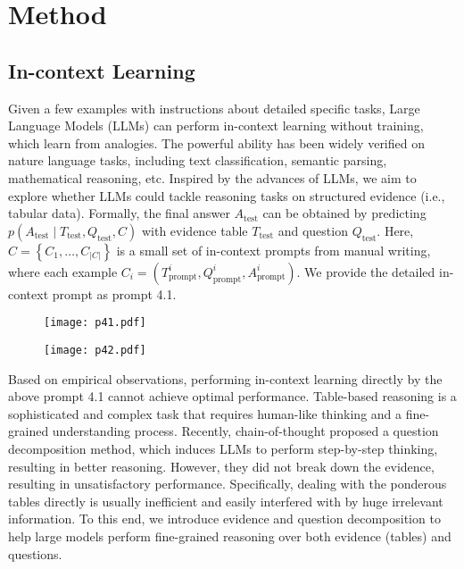 \section{Method}
\subsection{In-context Learning}
Given a few examples with instructions about detailed specific tasks, Large Language Models (LLMs) can perform in-context learning without training, which learn from analogies.
The powerful ability has been widely verified on nature language tasks, including text classification, semantic parsing, mathematical reasoning, etc.
Inspired by the advances of LLMs, we aim to explore whether LLMs could tackle reasoning tasks on structured evidence (i.e., tabular data).
Formally, the final answer $A_{\text{test}}$ can be obtained by predicting $p(A_{\text{test}} \mid T_{\text{test}}, Q_{\text{test}}, C)$ with evidence table $T_{\text{test}}$ and question $Q_{\text{test}}$. 
Here, $C=\left\{C_1, \ldots, C_{|C|}\right\}$ is a small set of in-context prompts from manual writing, where each example $C_i = (T_{\text{prompt}}^i, Q_{\text{prompt}}^i, A_{\text{prompt}}^i)$. 
We provide the detailed in-context prompt as prompt 4.1.

\begin{figure}[htbp]
\centering
\begin{minipage}[t]{0.48\textwidth}
\centering
\texttt{[image: p41.pdf]}
\end{minipage}
\begin{minipage}[t]{0.48\textwidth}
\centering
\texttt{[image: p42.pdf]}
\end{minipage}
\end{figure}

Based on empirical observations, performing in-context learning directly by the above prompt 4.1 cannot achieve optimal performance. Table-based reasoning is a sophisticated and complex task that requires human-like thinking and a fine-grained understanding process. Recently, chain-of-thought \citep{cot} proposed a question decomposition method, which induces LLMs to perform step-by-step thinking, resulting in better reasoning. 
However, they did not break down the evidence, resulting in unsatisfactory performance. Specifically, dealing with the ponderous tables directly is usually inefficient and easily interfered with by huge irrelevant information. %
To this end, we introduce evidence and question decomposition to help large models perform fine-grained reasoning over both evidence (tables) and questions.

